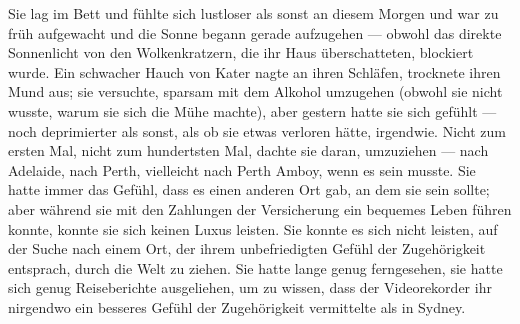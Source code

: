 Sie lag im Bett und fühlte sich lustloser als sonst an diesem Morgen und war zu früh aufgewacht und die Sonne begann gerade aufzugehen — obwohl das direkte Sonnenlicht von den Wolkenkratzern, die ihr Haus überschatteten, blockiert wurde. Ein schwacher Hauch von Kater nagte an ihren Schläfen, trocknete ihren Mund aus; sie versuchte, sparsam mit dem Alkohol umzugehen (obwohl sie nicht wusste, warum sie sich die Mühe machte), aber gestern hatte sie sich gefühlt — noch deprimierter als sonst, als ob sie etwas verloren hätte, irgendwie. Nicht zum ersten Mal, nicht zum hundertsten Mal, dachte sie daran, umzuziehen — nach Adelaide, nach Perth, vielleicht nach Perth Amboy, wenn es sein musste. Sie hatte immer das Gefühl, dass es einen anderen Ort gab, an dem sie sein sollte; aber während sie mit den Zahlungen der Versicherung ein bequemes Leben führen konnte, konnte sie sich keinen Luxus leisten. Sie konnte es sich nicht leisten, auf der Suche nach einem Ort, der ihrem unbefriedigten Gefühl der Zugehörigkeit entsprach, durch die Welt zu ziehen. Sie hatte lange genug ferngesehen, sie hatte sich genug Reiseberichte ausgeliehen, um zu wissen, dass der Videorekorder ihr nirgendwo ein besseres Gefühl der Zugehörigkeit vermittelte als in Sydney.

